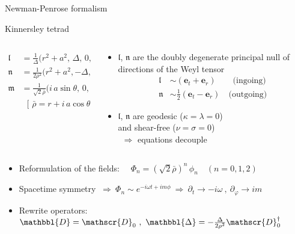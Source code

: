 \documentclass[9pt,serif,mathserif]{beamer}
\begin{document}
\begin{frame}[fragile]{Newman-Penrose formalism}
    \begin{block}{Kinnersley tetrad}
        \begin{columns}[onlytextwidth]   
            \begin{column}{0.5\textwidth}
                \begin{align*}
                    \bm{\mathfrak{l}} &= \frac{1}{\Delta} \Big( r^2+a^2, \,\Delta, \,0, \,a \Big) \\
                    \bm{\mathfrak{n}} &= \frac{1}{2 \rho^2} \Big( r^2+a^2, -\Delta, \,0, \,a \Big) \\
                    \bm{\mathfrak{m}} &= \frac{1}{\sqrt{2} \bar{\rho}} \Big( i \,a \sin\theta, \,0, \,1, \,i \csc\theta \Big) \\[0.3cm]
                    & ~~ [\,\bar{\rho} = r + i \,a \cos\theta \,]
                \end{align*}
            \end{column}
            \begin{column}{0.5\textwidth}
                \begin{itemize}
                    \item $\bm{\mathfrak{l}}$, $\bm{\mathfrak{n}}$ are the doubly degenerate principal null of directions of the Weyl tensor
                    \begin{align*}
                        \bm{\mathfrak{l}} &\sim (\bm{e}_t + \bm{e}_r)
                        \qquad\text{(ingoing)} \\
                        \bm{\mathfrak{n}} &\sim \tfrac{1}{2}(\bm{e}_t - \bm{e}_r) 
                        \quad\text{(outgoing)}
                    \end{align*}
                    \item $\bm{\mathfrak{l}}$, $\bm{\mathfrak{n}}$ are geodesic ($\kappa = \lambda=0$) \\ and shear-free ($\nu=\sigma=0$) \\ 
                    $~~\Rightarrow$ \alert{equations decouple}
                \end{itemize}
            \end{column}
        \end{columns}
    \end{block}
    \begin{itemize}
        \item Reformulation of the fields: $\quad\Phi_n = (\sqrt{2} \bar{\rho})^n \,\phi_n \quad (n=0,1,2)$
        \item Spacetime symmetry $~\Rightarrow~ \Phi_n \sim e^{-i\omega t + i m \phi}  ~\Rightarrow~ \partial_t \rightarrow -i\omega ~,~ \partial_\varphi \rightarrow i m$ 
        \item Rewrite operators: $\mathbbl{D} = \mathscr{D}_0 ~,~ \mathbbl{\Delta} = - \frac{\Delta}{2 \rho^2 }\mathscr{D}^\dagger_0$   
    \end{itemize}
\end{frame}
\end{document}

